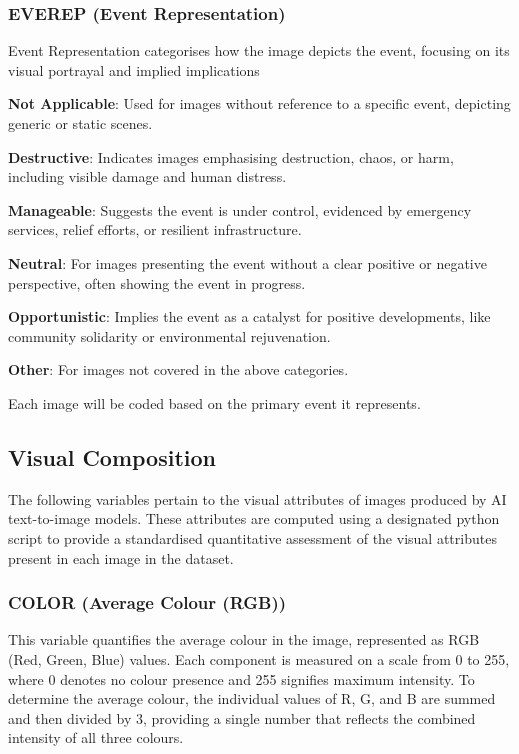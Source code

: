 \subsubsection*{EVEREP (Event Representation)}
\label{subsubsec:event-representation}
Event Representation categorises how the image depicts the event, focusing on its visual portrayal and implied implications

\begin{description}[leftmargin=2.5cm, style=multiline, labelwidth=1.5cm]
\item[0] \textbf{Not Applicable}: Used for images without reference to a specific event, depicting generic or static scenes.
\item[1] \textbf{Destructive}: Indicates images emphasising destruction, chaos, or harm, including visible damage and human distress.
\item[2] \textbf{Manageable}: Suggests the event is under control, evidenced by emergency services, relief efforts, or resilient infrastructure.
\item[3] \textbf{Neutral}: For images presenting the event without a clear positive or negative perspective, often showing the event in progress.
\item[4] \textbf{Opportunistic}: Implies the event as a catalyst for positive developments, like community solidarity or environmental rejuvenation.
\item[5] \textbf{Other}: For images not covered in the above categories.
\end{description}

Each image will be coded based on the primary event it represents.

\subsection{Visual Composition}
\label{subsec:visual-composition}


The following variables pertain to the visual attributes of images produced by AI text-to-image models. These attributes are computed using a designated python script to provide a standardised quantitative assessment of the visual attributes present in each image in the dataset.

\subsubsection*{COLOR (Average Colour (RGB))}
This variable quantifies the average colour in the image, represented as RGB (Red, Green, Blue) values. Each component is measured on a scale from 0 to 255, where 0 denotes no colour presence and 255 signifies maximum intensity. To determine the average colour, the individual values of R, G, and B are summed and then divided by 3, providing a single number that reflects the combined intensity of all three colours.

